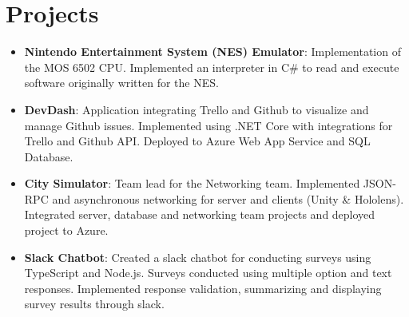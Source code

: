 \documentclass[letterpaper,11pt]{article}
\newcommand{\resumeItem}[2]{
  \item\small{
    \textbf{#1}{: #2 \vspace{-2pt}}
  }
}
\newcommand{\resumeSubItem}[2]{\resumeItem{#1}{#2}\vspace{-4pt}}
\newcommand{\resumeSubHeadingListStart}{\begin{itemize}[leftmargin=*]}
\newcommand{\resumeSubHeadingListEnd}{\end{itemize}}
\begin{document}
\section{Projects}
  \resumeSubHeadingListStart
    \resumeSubItem{Nintendo Entertainment System (NES) Emulator}
      {Implementation of the MOS 6502 CPU. Implemented an interpreter in C\# to read and execute software originally written for the NES.}
    \resumeSubItem{DevDash}
      {Application integrating Trello and Github to visualize and manage Github issues. Implemented using .NET Core with integrations for Trello and Github API. Deployed to Azure Web App Service and SQL Database.}
    \resumeSubItem{City Simulator}
      {Team lead for the Networking team. Implemented JSON-RPC and asynchronous networking for server and clients (Unity \& Hololens). Integrated server, database and networking team projects and deployed project to Azure.}
    \resumeSubItem{Slack Chatbot}
      {Created a slack chatbot for conducting surveys using TypeScript and Node.js. Surveys conducted using multiple option and text responses. Implemented response validation, summarizing and displaying survey results through slack.}
  \resumeSubHeadingListEnd

\end{document}
